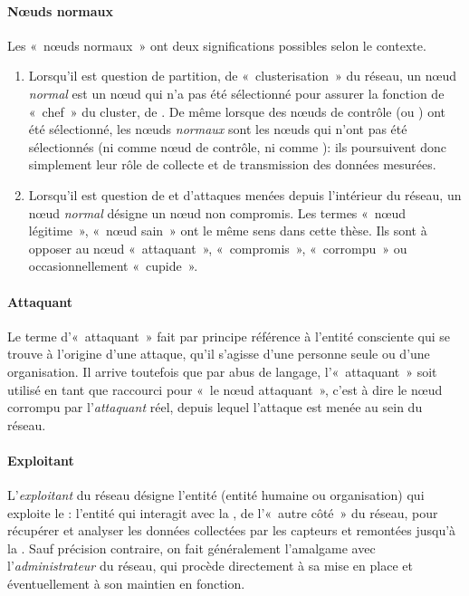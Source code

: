             \paragraph{Nœuds normaux}
Les « nœuds normaux » ont deux significations possibles selon le contexte.
\begin{enumerate}
    \item Lorsqu'il est question de partition, de « clusterisation » du réseau, un nœud \textit{normal} est un nœud qui n'a pas été sélectionné pour assurer la fonction de « chef » du cluster, de \ch. De même lorsque des nœuds de contrôle (\cns ou \vns) ont été sélectionné, les nœuds \textit{normaux} sont les nœuds qui n'ont pas été sélectionnés (ni comme nœud de contrôle, ni comme \ch): ils poursuivent donc simplement leur rôle de collecte et de transmission des données mesurées.
    \item Lorsqu'il est question de \secu et d'attaques menées depuis l'intérieur du réseau, un nœud \textit{normal} désigne un nœud non compromis. Les termes « nœud légitime », « nœud sain » ont le même sens dans cette thèse. Ils sont à opposer au nœud « attaquant », « compromis », « corrompu » ou occasionnellement « cupide ».
\end{enumerate}

            \paragraph{Attaquant}
Le terme d'« attaquant » fait par principe référence à l'entité consciente qui se trouve à l'origine d'une attaque, qu'il s'agisse d'une personne seule ou d'une organisation.
Il arrive toutefois que par abus de langage, l'« attaquant » soit utilisé en tant que raccourci pour « le nœud attaquant », c'est à dire le nœud corrompu par l'\textit{attaquant} réel, depuis lequel l'attaque est menée au sein du réseau.

            \paragraph{Exploitant}
L'\textit{exploitant} du réseau désigne l'entité (entité humaine ou organisation) qui exploite le \rcsfs: l'entité qui interagit avec la \sdb, de l'« autre côté » du réseau, pour récupérer et analyser les données collectées par les capteurs et remontées jusqu'à la \BS.
Sauf précision contraire, on fait généralement l'amalgame avec l'\textit{administrateur} du réseau, qui procède directement à sa mise en place et éventuellement à son maintien en fonction.

